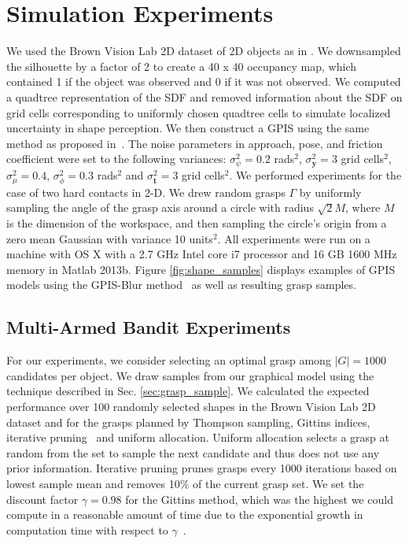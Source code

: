 \documentclass[10pt, conference]{ieeeconf}      %
\newcommand{\bt}{\mathbf{t}}
\newcommand{\by}{\mathbf{y}}
\begin{document}
\section{Simulation Experiments}
We used the Brown Vision Lab 2D dataset \cite{brown} of 2D objects as in \cite{christopoulos2007handling}.
We downsampled the silhouette by a factor of 2 to create a 40 x 40 occupancy map, which contained 1 if the object was
observed and 0 if it was not observed. We computed a quadtree representation of the SDF and removed information about
the SDF on grid cells corresponding to uniformly chosen quadtree cells to simulate localized uncertainty in shape perception.
We then construct a GPIS using the same method as proposed in~\cite{mahler2015gp}.
The noise parameters in approach, pose, and friction coefficient were set to the following variances: $\sigma_{\psi}^2 = 0.2$ rads$^2$, $\sigma_{\by}^2 = 3$ grid cells$^2$, $\sigma_{\mu}^2 = 0.4$, $\sigma_{\phi}^2 = 0.3$ rads$^2$ and $\sigma_{\bt}^2 = 3$ grid cells$^2$.
We  performed experiments for the case of two hard contacts in 2-D.
We drew random grasps $\Gamma$ by uniformly sampling the angle of the grasp axis around a circle with radius $\sqrt{2}
M$, where $M$ is the dimension of the workspace, and then sampling the circle's origin from a zero mean Gaussian with
variance 10 units$^2$. All experiments were run on a machine with OS X with a 2.7 GHz Intel core i7 processor and 16 GB
1600 MHz memory in Matlab 2013b. 
Figure \ref{fig:shape_samples} displays examples of GPIS models using the GPIS-Blur method~\cite{mahler2015gp}
as well as resulting grasp samples.

\subsection{Multi-Armed Bandit Experiments}
For our experiments, we consider selecting an optimal grasp among $|G| = 1000$ candidates per object. We draw samples from our
graphical model using the technique described in Sec.  \ref{sec:grasp_sample}. We calculated the expected performance
over 100 randomly selected shapes in the Brown Vision Lab 2D dataset and for the grasps planned by Thompson sampling,
Gittins indices, iterative pruning~\cite{kehoe2012toward} and uniform allocation. Uniform allocation selects a grasp at
random from the set to sample the next candidate and thus does not use any prior information. Iterative pruning prunes
grasps every 1000 iterations based on lowest sample mean and removes 10$\%$ of the current grasp set.  We set the
discount factor $\gamma =0.98$ for the Gittins method, which was the highest we could compute in a reasonable amount of
time due to the exponential growth in computation time with respect to $\gamma$~\cite{gittins2011multi}. 
\end{document}

